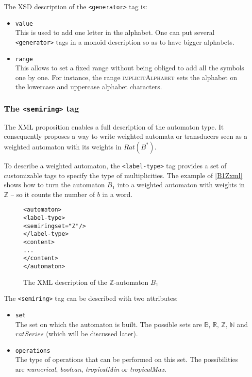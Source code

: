 \documentclass[a4paper]{article}
\newcommand{\xtag}[1]{\texttt{<#1>}}
\newcommand{\xattr}[1]{\texttt{#1}}
\def\typetagend{\xtag{/label-type}}
\def\typetag{\xtag{label-type}}
\def\semiringtag{\xtag{semiring}}
\def\generatortag{\xtag{generator}}
\begin{document}
The XSD description of the \generatortag{} tag is:
\begin{itemize}
\item \xattr{value}\\
  This is used to add one letter in the alphabet. One can put several
  \generatortag{} tags in a monoid description so as to have bigger
  alphabets.
\item \xattr{range}\\
  This allows to set a fixed range without being obliged to add all
  the symbols one by one. For instance, the range \textsc{implicitAlphabet}
  sets the alphabet on the lowercase and uppercase alphabet characters.
\end{itemize}

\subsubsection{The \semiringtag{} tag}

The XML proposition enables a full description of the automaton type.
It consequently proposes a way to write weighted automata or
transducers seen as a weighted automaton with its weights in
$Rat(B^*)$.

To describe a weighted automaton, the \typetag{} tag provides a set of
customizable tags to specify the type of multiplicities. The example
of \autoref{B1Zxml} shows how to turn the automaton $B_1$ into a
weighted automaton with weights in ${\mathbb Z}$ -- so it counts the
number of $b$ in a word.

\begin{figure}[ht]
  \small
  \begin{center}
\begin{alltt}
<automaton>
  \typetag{}
     <semiring set="Z"/>
  \typetagend{}
  <content>
  ...
  </content>
</automaton>
\end{alltt}

\caption{The XML description of the $\mathbb{Z}$-automaton $B_1$}
\label{B1Zxml}
  \end{center}
\end{figure}

The \semiringtag{} tag can be described with two attributes:
\begin{itemize}
\item \xattr{set}\\
  The set on which the automaton is built. The possible sets are
  ${\mathbb B}$, ${\mathbb R}$, ${\mathbb Z}$, ${\mathbb N}$ and
  $ratSeries$ (which will be discussed later).
\item \xattr{operations}\\
  The type of operations that can be performed on this set.  The
  possibilities are \textit{numerical}, \textit{boolean},
  \textit{tropicalMin} or \textit{tropicalMax}.
\end{itemize}
\end{document}
